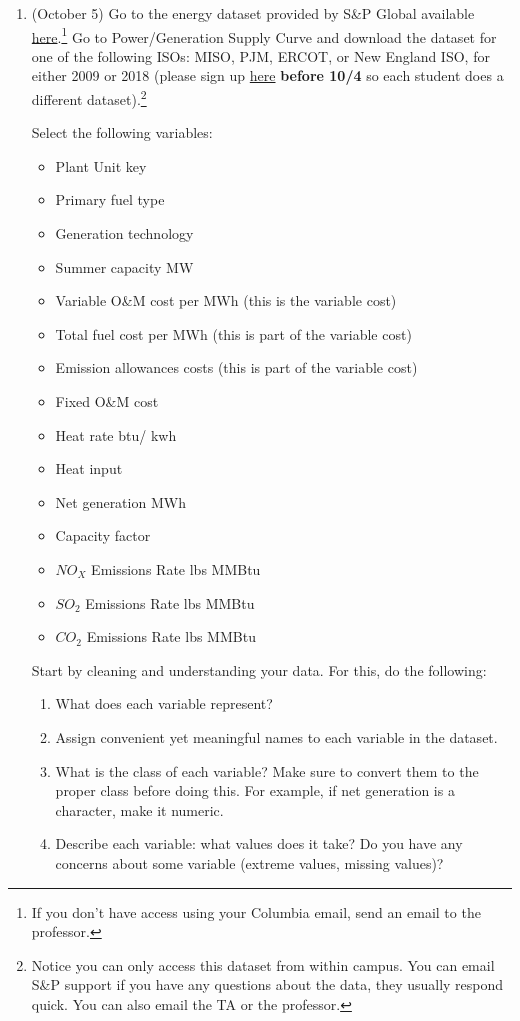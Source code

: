 \documentclass[11pt]{article}
\begin{document}
 
\begin{enumerate}
	
	\item (October 5) Go to the energy dataset provided by S\&P Global available \href{https://platform.mi.spglobal.com/web/client?auth=inherit#news/home}{here}.\footnote{If you don't have access using your Columbia email, send an email to the professor.} Go to Power/Generation Supply Curve and download the  dataset for one of the following ISOs:  MISO, PJM, ERCOT, or New England ISO, for either 2009 or 2018 (please sign up \href{https://docs.google.com/spreadsheets/d/1zkZpxXjbmGmKryrFiwYVkW4bj-pE-RdYL4CNSW-uaeE/edit?usp=sharing}{here} \textbf{before 10/4} so each student does a different dataset).\footnote{Notice you can only access this dataset from within campus. You can email S\&P support if you have any questions about the data, they usually respond quick. You can also email the TA or the professor.}
		
		 Select the following variables: 
			\begin{itemize}
			\item Plant Unit key
			\item Primary fuel type
			\item Generation technology
			\item Summer capacity MW
			\item Variable O\&M cost per MWh (this is the variable cost)
			\item Total fuel cost per MWh (this is part of the variable cost)
			\item Emission allowances costs (this is part of the variable cost)
			\item Fixed O\&M cost
			\item Heat rate btu/ kwh
			\item Heat input
			\item Net generation MWh
			\item Capacity factor
			\item $NO_X$ Emissions Rate lbs MMBtu
			\item $SO_2$ Emissions Rate lbs MMBtu
			\item $CO_2$ Emissions Rate lbs MMBtu
			\end{itemize}

\clearpage
	Start by cleaning and understanding your data.
	For this, do the following:
	\begin{enumerate}
	\item What does each variable represent?
	\item Assign convenient yet meaningful names to each variable in the dataset.
	\item What is the class of each variable? Make sure to convert them to the proper class before doing this. For example, if net generation is a character, make it numeric.
	\item Describe each variable: what values does it take? Do you have any concerns about some variable (extreme values, missing values)?
	\end{enumerate}
 

\end{enumerate}
\end{document}
